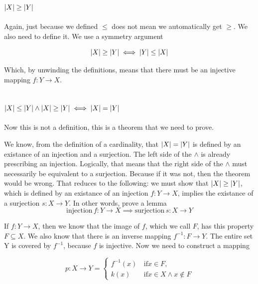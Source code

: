\documentclass[11pt,a4paper]{article}
\begin{document}
\subsection{$\abs{X} \geq \abs{Y}$}

Again, just because we defined $\leq$ does not mean we automatically
get $\geq$. We also need to define it. We use a symmetry argument

\begin{equation}
  \abs{X} \geq \abs{Y} \iff \abs{Y} \leq \abs{X}
\end{equation}

Which, by unwinding the definitions, means that there must be an injective
mapping $f: Y \to X$.

\subsection{$\abs{X} \leq \abs{Y} \land \abs{X} \geq \abs{Y} \iff \abs{X} = \abs{Y}$}

Now this is not a definition, this is a theorem that we need to prove.

We know, from the definition of a cardinality, that $\abs{X} = \abs{Y}$ is defined
by an existance of an injection and a surjection. The left side of the $\land$ is
already prescribing an injection. Logically, that means that the right side of
the $\land$ must necessarily be equivalent to a surjection. Because if it was
not, then the theorem would be wrong. That reduces to the following:
we must show that $\abs{X} \geq \abs{Y}$, which is defined by an existance
of an injection $f: Y \to X$, implies the existance of a surjection $s: X \to Y$.
In other words, prove a lemma
\begin{equation}
  \text{injection} \, f: Y \to X \implies \text{surjection} \, s: X \to Y
\end{equation}

If $f: Y \to X$, then we know that the image of $f$, which we call $F$, has
this property $F \subseteq X$. We also know that there is an inverse mapping
$f^{-1}: F \to Y$. The entire set Y is covered by $f^{-1}$, because $f$ is injective.
Now we need to construct a mapping

\begin{equation}
  p: X \to Y =
  \begin{cases}
    f^{-1}(x) & \, \text{if} x \in F, \\
    k(x)      & \, \text{if} x \in X \land x \notin F
  \end{cases}
\end{equation}
\end{document}

